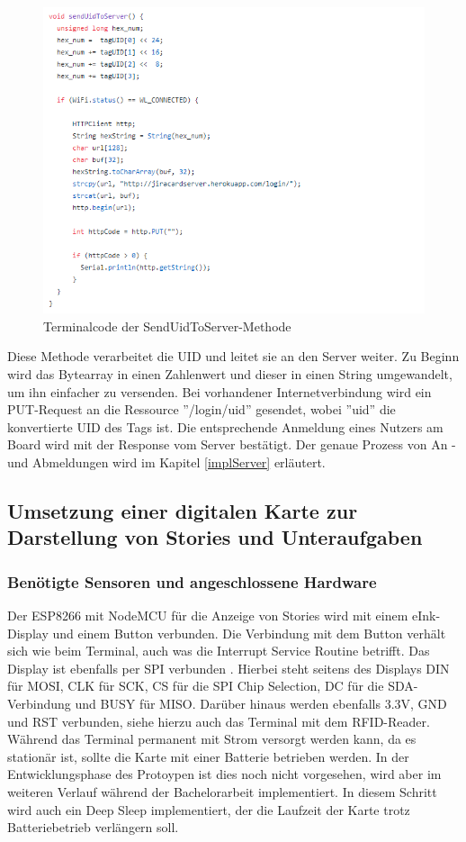\documentclass[12pt,titlepage]{scrartcl}
\begin{document}
		\begin{figure}[H] 
  			\centering
    		\includegraphics[height=0.5\textheight]{terminalSendUid}
  			\caption{Terminalcode der SendUidToServer-Methode}
  			\label{fig:terminalSendUid}
		\end{figure}
		\noindent Diese Methode verarbeitet die UID und leitet sie an den Server weiter. Zu Beginn wird das Bytearray in einen Zahlenwert und dieser in einen String umgewandelt, um ihn einfacher zu versenden. Bei vorhandener Internetverbindung wird ein PUT-Request an die Ressource ''/login/uid'' gesendet, wobei ''uid'' die konvertierte UID des Tags ist. Die entsprechende Anmeldung eines Nutzers am Board wird mit der Response vom Server bestätigt. Der genaue Prozess von An -und Abmeldungen wird im Kapitel \ref{implServer} erläutert.
		\subsection{Umsetzung einer digitalen Karte zur Darstellung von Stories und Unteraufgaben}
			\subsubsection{Benötigte Sensoren und angeschlossene Hardware}
			Der ESP8266 mit NodeMCU für die Anzeige von Stories wird mit einem eInk-Display und einem Button verbunden. Die Verbindung mit dem Button verhält sich wie beim Terminal, auch was die Interrupt Service Routine betrifft. Das Display ist ebenfalls per SPI verbunden \cite{wavesharespecs}. Hierbei steht seitens des Displays DIN für MOSI, CLK für SCK, CS für die SPI Chip Selection, DC für die SDA-Verbindung und BUSY für MISO. Darüber hinaus werden ebenfalls 3.3V, GND und RST verbunden, siehe hierzu auch das Terminal mit dem RFID-Reader. Während das Terminal permanent mit Strom versorgt werden kann, da es stationär ist, sollte die Karte mit einer Batterie betrieben werden. In der Entwicklungsphase des Protoypen ist dies noch nicht vorgesehen, wird aber im weiteren Verlauf während der Bachelorarbeit implementiert. In diesem Schritt wird auch ein Deep Sleep implementiert, der die Laufzeit der Karte trotz Batteriebetrieb verlängern soll.
\end{document}

